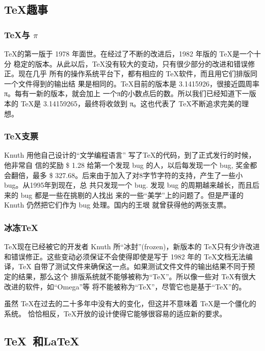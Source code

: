 \documentclass[DIV=14,fontsize=11,headinclude=false,index=totoc,footinclude=false,headings=small]{tkz-doc}
\begin{document}
\subsection{\TeX 趣事}
\label{sec:faq}

\subsubsection{\TeX 与 $\pi$}
\label{sec:pi}

\TeX 的第一版于 1978 年面世。在经过了不断的改进后，1982 年版的 \TeX 是一个十分
稳定的版本。从此以后，\TeX 没有较大的变动，只有很少部分的改进和错误修正。现在几乎
所有的操作系统平台下，都有相应的 \TeX 软件，而且用它们排版同一个文件得到的输出结
果是相同的。\TeX 目前的版本是 3.1415926，很接近圆周率π。每有一新的版本，就会加上
一个π的小数点后的数。所以我们已经知道下一版本的 \TeX 是 3.14159265，最终将收敛到
π。这也代表了 \TeX 不断追求完美的理想。

\subsubsection{\TeX 支票}
\label{sec:check}

Knuth 用他自己设计的“文学编程语言” 写了\TeX 的代码，到了正式发行的时候，他非常自
信的奖励 \$ 1.28 给第一个发现 bug 的人，以后每发现一个 bug, 奖金都会翻倍，最多
\$ 327.68。后来由于加入了对8字节字符的支持，产生了一些小 bug。从1995年到现在，总
共只发现一个 bug. 发现 bug 的周期越来越长，而且后来的 bug 都是一些在挑剔的人找出
来的一些“美学”上的问题了。但是严谨的 Knuth 仍然把它们作为 bug 处理。国内的王垠
就曾获得他的两张支票。

\subsubsection{冰冻\TeX}
\label{sec:fronzen}

\TeX 现在已经被它的开发者 Knuth 所“冰封”(frozen)，新版本的 \TeX 只有少许改进
和错误修正。这些变动必须保证不会使得即使是写于 1982 年的 \TeX 文档无法编译，\TeX
自带了测试文件来确保这一点。如果测试文件文件的输出结果不同于预定的结果，那么这个
排版系统就不能够被称为“\TeX”。所以像一些对 \TeX 有很大改进的软件，如“Omega”等
将不能被称为“\TeX”，尽管它也是基于“\TeX”的。

虽然 \TeX 在过去的二十多年中没有大的变化，但这并不意味着 \TeX 是一个僵化的系统。
恰恰相反，\TeX 开放的设计使得它能够很容易的适应新的要求。


\subsection{\TeX\ 和\LaTeX{}}
\label{sec:texandlatex}
\end{document}
